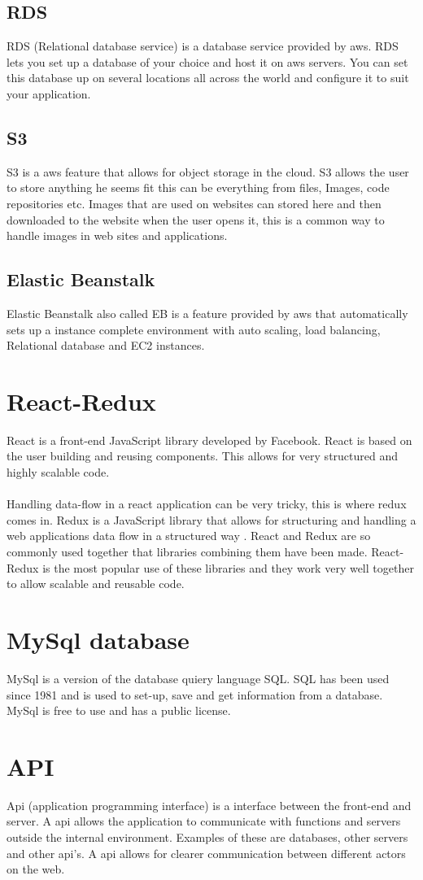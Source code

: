 \subsection{RDS}
RDS (Relational database service) is a database service provided by aws. RDS lets you set up a database of your choice and host it on aws servers. You can set this database up on several locations all across the world and configure it to suit your application.
\subsection{S3}
S3 is a aws feature that allows for object storage in the cloud. S3 allows the user to store anything he seems fit this can be everything from files, Images, code repositories etc. Images that are used on websites can stored here and then downloaded to the website when the user opens it, this is a common way to handle images in web sites and applications.
\subsection{Elastic Beanstalk}
Elastic Beanstalk also called EB is a feature provided by aws that automatically sets up a instance complete environment with auto scaling, load balancing, Relational database and EC2 instances.
\section{React-Redux}
React is a front-end JavaScript library developed by Facebook. React is based on the user building and reusing components. This allows for very structured and highly scalable code.
\\\\
Handling data-flow in a react application can be very tricky, this is where redux comes in. Redux is a JavaScript library that allows for structuring and handling a web applications data flow in a structured way . React and Redux are so commonly used together that libraries combining them have been made. React-Redux is the most popular use of these libraries and they work very well together to allow scalable and reusable code. 

\section{MySql database}
MySql is a version of the database quiery language SQL. SQL has been used since 1981 and is used to set-up, save and get information from a database. MySql is free to use and has a public license.
\section{API}
Api (application programming interface) is a interface between the front-end and server. A api allows the application to communicate with functions and servers outside the internal environment. Examples of these are databases, other servers and other api's. A api allows for clearer communication between different actors on the web. 

